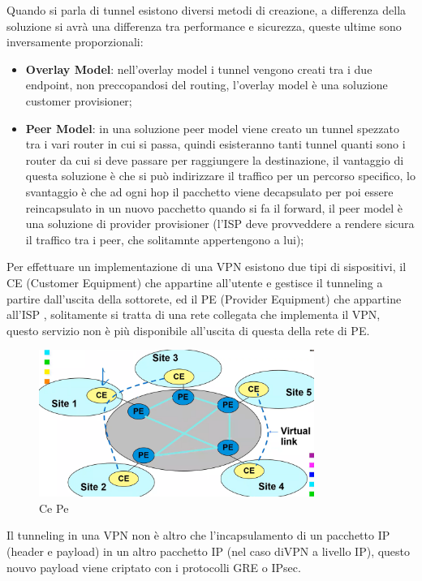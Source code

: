 \documentclass[12pt]{article}
\begin{document}
Quando si parla di tunnel esistono diversi metodi di creazione, a differenza della soluzione si avr\`a una differenza tra performance e sicurezza, queste ultime sono inversamente proporzionali:
\begin{itemize}
    \item \textbf{Overlay Model}: nell'overlay model i tunnel vengono creati tra i due endpoint, non preccopandosi del routing, l'overlay model \`e una soluzione customer provisioner;
    \item \textbf{Peer Model}: in una soluzione peer model viene creato un tunnel spezzato tra i vari router in cui si passa, quindi esisteranno tanti tunnel quanti sono i router da cui si deve passare per raggiungere la destinazione, il vantaggio di questa soluzione \`e che si pu\`o indirizzare il traffico per un percorso specifico, lo svantaggio \`e che ad ogni hop il pacchetto viene decapsulato per poi essere reincapsulato in un nuovo pacchetto quando si fa il forward, il peer model \`e una soluzione di provider provisioner (l'ISP deve provveddere a rendere sicura il traffico tra i peer, che solitamnte appertengono a lui);
\end{itemize}
Per effettuare un implementazione di una VPN esistono due tipi di sispositivi, il CE (Customer Equipment) che appartine all'utente e gestisce il tunneling a partire dall'uscita della sottorete, ed il PE (Provider Equipment) che appartine all'ISP , solitamente si tratta di una rete collegata che implementa il VPN, questo servizio non \`e pi\`u disponibile all'uscita di questa della rete di PE.
\begin{figure}[H]
    \centering
    \includegraphics[width=0.8\textwidth]{ce-pe.png}
    \caption{Ce Pe}
    \label{fig:ce-pe}
\end{figure}


Il tunneling in una VPN non \`e altro che l'incapsulamento di un pacchetto IP (header e payload) in un altro pacchetto IP (nel caso diVPN a livello IP), questo nouvo payload viene criptato con i protocolli GRE o IPsec.
\end{document}
